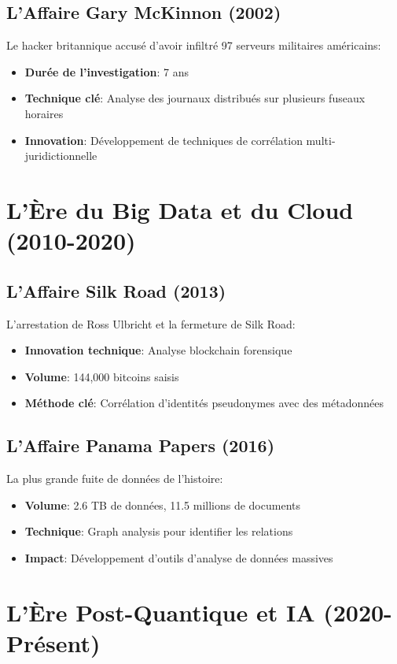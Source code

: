\subsection{L'Affaire Gary McKinnon (2002)}
Le hacker britannique accusé d'avoir infiltré 97 serveurs militaires américains:

\begin{itemize}
\item \textbf{Durée de l'investigation}: 7 ans
\item \textbf{Technique clé}: Analyse des journaux distribués sur plusieurs fuseaux horaires
\item \textbf{Innovation}: Développement de techniques de corrélation multi-juridictionnelle
\end{itemize}

\section{L'Ère du Big Data et du Cloud (2010-2020)}
\subsection{L'Affaire Silk Road (2013)}
L'arrestation de Ross Ulbricht et la fermeture de Silk Road:

\begin{itemize}
\item \textbf{Innovation technique}: Analyse blockchain forensique
\item \textbf{Volume}: 144,000 bitcoins saisis
\item \textbf{Méthode clé}: Corrélation d'identités pseudonymes avec des métadonnées
\end{itemize}

\subsection{L'Affaire Panama Papers (2016)}
La plus grande fuite de données de l'histoire:

\begin{itemize}
\item \textbf{Volume}: 2.6 TB de données, 11.5 millions de documents
\item \textbf{Technique}: Graph analysis pour identifier les relations
\item \textbf{Impact}: Développement d'outils d'analyse de données massives
\end{itemize}

\section{L'Ère Post-Quantique et IA (2020-Présent)}
